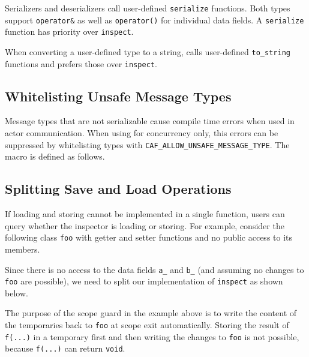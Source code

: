 Serializers and deserializers call user-defined \lstinline^serialize^ functions. Both types support \lstinline^operator&^ as well as \lstinline^operator()^ for individual data fields. A \lstinline^serialize^ function has priority over \lstinline^inspect^.

When converting a user-defined type to a string, \lib calls user-defined \lstinline^to_string^ functions and prefers those over \lstinline^inspect^.

\subsection{Whitelisting Unsafe Message Types}
\label{unsafe-message-type}

Message types that are not serializable cause compile time errors when used in actor communication. When using \lib for concurrency only, this errors can be suppressed by whitelisting types with \lstinline^CAF_ALLOW_UNSAFE_MESSAGE_TYPE^. The macro is defined as follows.



\clearpage
\subsection{Splitting Save and Load Operations}

If loading and storing cannot be implemented in a single function, users can query whether the inspector is loading or storing. For example, consider the following class \lstinline^foo^ with getter and setter functions and no public access to its members.



\clearpage
Since there is no access to the data fields \lstinline^a_^ and \lstinline^b_^ (and assuming no changes to \lstinline^foo^ are possible), we need to split our implementation of \lstinline^inspect^ as shown below.



The purpose of the scope guard in the example above is to write the content of the temporaries back to \lstinline^foo^ at scope exit automatically. Storing the result of \lstinline^f(...)^ in a temporary first and then writing the changes to \lstinline^foo^ is not possible, because \lstinline^f(...)^ can return \lstinline^void^.
